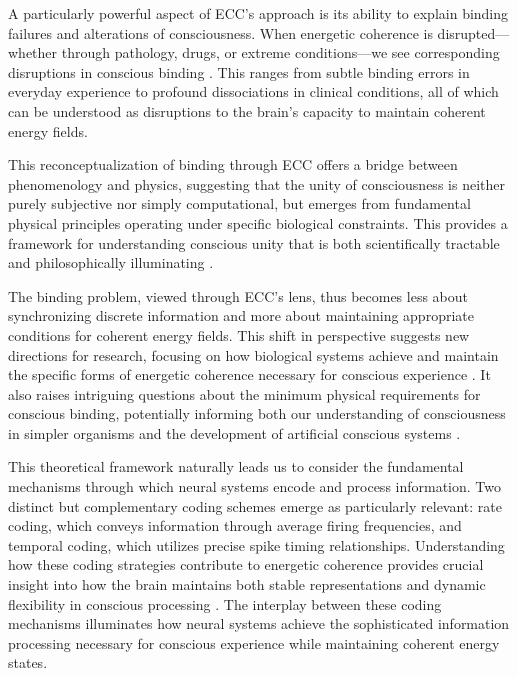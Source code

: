 \begin{refsection}
A particularly powerful aspect of ECC's approach is its ability to explain binding failures and alterations of consciousness. When energetic coherence is disrupted—whether through pathology, drugs, or extreme conditions—we see corresponding disruptions in conscious binding \cite{wang2010neurophysiological}. This ranges from subtle binding errors in everyday experience to profound dissociations in clinical conditions, all of which can be understood as disruptions to the brain's capacity to maintain coherent energy fields.

This reconceptualization of binding through ECC offers a bridge between phenomenology and physics, suggesting that the unity of consciousness is neither purely subjective nor simply computational, but emerges from fundamental physical principles operating under specific biological constraints. This provides a framework for understanding conscious unity that is both scientifically tractable and philosophically illuminating \cite{roskies1999binding}.

The binding problem, viewed through ECC's lens, thus becomes less about synchronizing discrete information and more about maintaining appropriate conditions for coherent energy fields. This shift in perspective suggests new directions for research, focusing on how biological systems achieve and maintain the specific forms of energetic coherence necessary for conscious experience \cite{kumar2010spiking}. It also raises intriguing questions about the minimum physical requirements for conscious binding, potentially informing both our understanding of consciousness in simpler organisms and the development of artificial conscious systems \cite{buzsaki2004neuronal}.

This theoretical framework naturally leads us to consider the fundamental mechanisms through which neural systems encode and process information. Two distinct but complementary coding schemes emerge as particularly relevant: rate coding, which conveys information through average firing frequencies, and temporal coding, which utilizes precise spike timing relationships. Understanding how these coding strategies contribute to energetic coherence provides crucial insight into how the brain maintains both stable representations and dynamic flexibility in conscious processing \cite{panzeri2010sensory, lisman2013theta}. The interplay between these coding mechanisms illuminates how neural systems achieve the sophisticated information processing necessary for conscious experience while maintaining coherent energy states.


\end{refsection}
